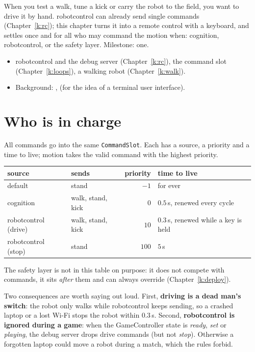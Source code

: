 \label{k:cmd}

When you test a walk, tune a kick or carry the robot to the field, you want to drive it by hand. robotcontrol can already send single commands (Chapter~\ref{k:rc}); this chapter turns it into a remote control with a keyboard, and settles once and for all who may command the motion when: cognition, robotcontrol, or the safety layer. Milestone: one.

\begin{needbox}
\begin{itemize}[nosep]
  \item robotcontrol and the debug server (Chapter~\ref{k:rc}), the command slot (Chapter~\ref{k:loops}), a walking robot (Chapter~\ref{k:walk}).
  \item Background: ,  (for the idea of a terminal user interface).
\end{itemize}
\end{needbox}

\section*{Who is in charge}
All commands go into the same \texttt{CommandSlot}. Each has a source, a priority and a time to live; motion takes the valid command with the highest priority.
\begin{center}
\small
\begin{tabular}{llrl}
\hline
source & sends & priority & time to live\\
\hline
default & stand & $-1$ & for ever\\
cognition & walk, stand, kick & $0$ & $0.5$\,s, renewed every cycle\\
robotcontrol (drive) & walk, stand, kick & $10$ & $0.3$\,s, renewed while a key is held\\
robotcontrol (stop) & stand & $100$ & $5$\,s\\
\hline
\end{tabular}
\end{center}
The safety layer is not in this table on purpose: it does not compete with commands, it sits \emph{after} them and can always override (Chapter~\ref{k:deploy}).

Two consequences are worth saying out loud. First, \textbf{driving is a dead man's switch}: the robot only walks while robotcontrol keeps sending, so a crashed laptop or a lost Wi-Fi stops the robot within $0.3$\,s. Second, \textbf{robotcontrol is ignored during a game}: when the GameController state is \emph{ready}, \emph{set} or \emph{playing}, the debug server drops drive commands (but not \emph{stop}). Otherwise a forgotten laptop could move a robot during a match, which the rules forbid.

